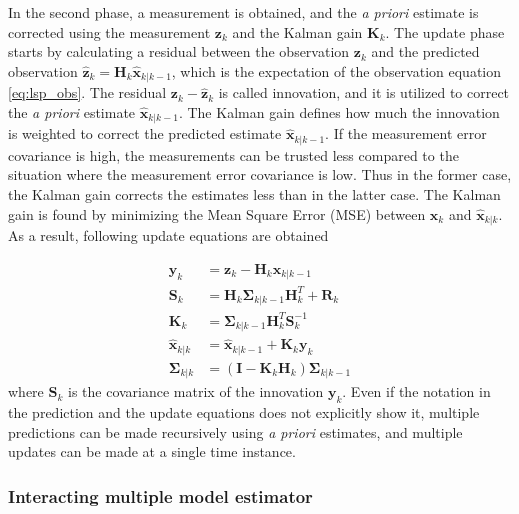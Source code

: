 \documentclass[english, 12pt, a4paper, elec, utf8, a-1b, online]{aaltothesis}
\numberwithin{equation}{section}
\renewcommand{\vec}[1]{\mathbf{#1}}
\newcommand{\inv}[1]{#1^{-1}}
\newcommand{\xprior}{\hat{\vec{x}}_{k|k-1}}
\newcommand{\xpost}{\hat{\vec{x}}_{k|k}}
\newcommand{\priorecov}{\boldsymbol{\Sigma}_{k|k-1}}
\newcommand{\postecov}{\boldsymbol{\Sigma}_{k|k}}
\newcommand{\prefitinnov}{\vec{y}_k}
\newcommand{\x}{\vec{x}_k}
\newcommand{\z}{\vec{z}_k}
\newcommand{\omodel}{\vec{H}_k}
\newcommand{\ocov}{\vec{R}_k}
\newcommand{\innocov}{\vec{S}_k}
\newcommand{\eye}{\vec{I}}
\newcommand{\gain}{\vec{K}_k}
\def\prior{\textit{a priori}}
\newcommand{\zhat}{\hat{\vec{z}}_k}
\begin{document}
In the second phase, a measurement is obtained, and the \prior{} estimate is corrected using the measurement $\z$ and the Kalman gain $\gain$.
The update phase starts by calculating a residual between the observation $\z$ and the predicted observation $\zhat = \omodel \xprior$, which is the expectation of the observation equation \eqref{eq:lsp_obs}.
The residual $\z-\zhat$ is called innovation, and it is utilized to correct the \prior{} estimate $\xprior$.
The Kalman gain defines how much the innovation is weighted to correct the predicted estimate $\xprior$.
If the measurement error covariance is high, the measurements can be trusted less compared to the situation where the measurement error covariance is low.
Thus in the former case, the Kalman gain corrects the estimates less than in the latter case.
The Kalman gain is found by minimizing the Mean Square Error (MSE) between $\x$ and $\xpost$.
As a result, following update equations are obtained \cite{Zarchan2000}

\begin{align}
    \prefitinnov &= \z - \omodel \xprior \label{eq:kf_prefit_innov}\\ 
    \innocov &= \omodel \priorecov \omodel^T + \ocov \label{eq:kf_innov_cov}\\ 
    \gain &= \priorecov \omodel^T \inv{\innocov} \label{eq:kf_gain}\\ 
    \xpost &= \xprior + \gain \prefitinnov \label{eq:kf_update_x}\\ 
    \postecov &= \left( \eye - \gain \omodel \right) \priorecov  \label{eq:kf_post_error_cov}
\end{align}
where $\innocov$ is the covariance matrix of the innovation $\prefitinnov$. 
Even if the notation in the prediction and the update equations does not explicitly show it, multiple predictions can be made recursively using \prior{} estimates, and multiple updates can be made at a single time instance.

\subsubsection{Interacting multiple model estimator}
\label{sec:IMM}
\end{document}
